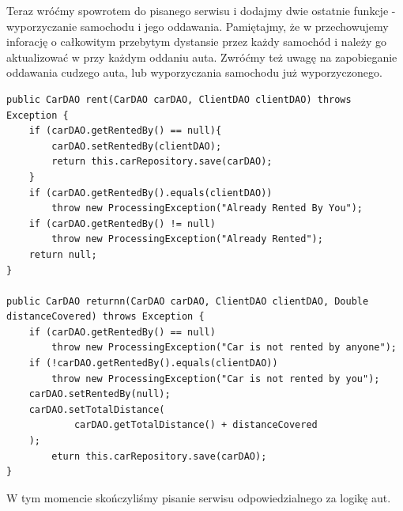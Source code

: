 \documentclass{article}
\begin{document}
        Teraz wróćmy spowrotem do pisanego serwisu i dodajmy dwie ostatnie funkcje - wyporzyczanie samochodu i jego oddawania. Pamiętajmy, że w przechowujemy inforację o całkowitym przebytym dystansie przez każdy samochód i należy go aktualizować w przy każdym oddaniu auta. Zwróćmy też uwagę na zapobieganie oddawania cudzego auta, lub wyporzyczania samochodu już wyporzyczonego.
        \begin{verbatim}
public CarDAO rent(CarDAO carDAO, ClientDAO clientDAO) throws Exception {
    if (carDAO.getRentedBy() == null){
        carDAO.setRentedBy(clientDAO);
        return this.carRepository.save(carDAO);
    }
    if (carDAO.getRentedBy().equals(clientDAO))
        throw new ProcessingException("Already Rented By You");
    if (carDAO.getRentedBy() != null)
        throw new ProcessingException("Already Rented");
    return null;
}

public CarDAO returnn(CarDAO carDAO, ClientDAO clientDAO, Double distanceCovered) throws Exception {
    if (carDAO.getRentedBy() == null)
        throw new ProcessingException("Car is not rented by anyone");
    if (!carDAO.getRentedBy().equals(clientDAO))
        throw new ProcessingException("Car is not rented by you");
    carDAO.setRentedBy(null);
    carDAO.setTotalDistance(
            carDAO.getTotalDistance() + distanceCovered
    );
        eturn this.carRepository.save(carDAO);
}
        \end{verbatim}
        W tym momencie skończyliśmy pisanie serwisu odpowiedzialnego za logikę aut.
\end{document}
